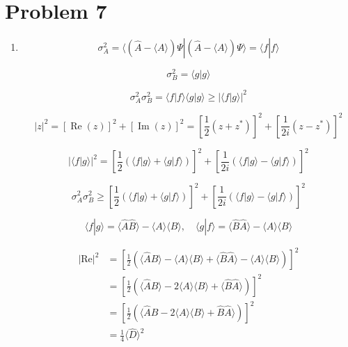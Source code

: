 \documentclass[12pt]{article}
\begin{document}
\section{Problem 7}
\begin{enumerate}
    \item

          \[
              \sigma_A^2 = \langle ( \hat{A} - \langle A \rangle ) \Psi | ( \hat{A} - \langle A \rangle ) \Psi \rangle = \langle f | f \rangle
          \]

          \[
              \sigma_B^2 = \langle g | g \rangle
          \]

          \[
              \sigma_A^2 \sigma_B^2 = \langle f | f \rangle \langle g | g \rangle \geq | \langle f | g \rangle |^2
          \]

          \[
              |z|^2 = [\operatorname{Re}(z)]^2 + [\operatorname{Im}(z)]^2 = \left[ \frac{1}{2} (z + z^*) \right]^2 + \left[ \frac{1}{2i} (z - z^*) \right]^2
          \]

          \[
              |\langle f | g \rangle |^2 = \left[ \frac{1}{2} (\langle f | g \rangle  + \langle g | f \rangle) \right]^2 + \left[ \frac{1}{2i} (\langle f | g \rangle  - \langle g | f \rangle ) \right]^2
          \]

          \[
              \sigma_A^2 \sigma_B^2 \geq \left[ \frac{1}{2} (\langle f | g \rangle + \langle g | f \rangle) \right]^2 + \left[ \frac{1}{2i} (\langle f | g \rangle - \langle g | f \rangle) \right]^2
          \]

          \[
              \langle f | g \rangle = \langle \hat{A} \hat{B} \rangle - \langle A \rangle \langle B \rangle, \quad
              \langle g | f \rangle = \langle \hat{B} \hat{A} \rangle - \langle A \rangle \langle B \rangle
          \]

          \begin{equation*}
              \begin{split}
                  {|\text{Re}|}^2
                   & = \left[ \frac{1}{2} (\langle \hat{A} \hat{B} \rangle - \langle A \rangle \langle B \rangle + \langle \hat{B} \hat{A} \rangle - \langle A \rangle \langle B \rangle) \right]^2 \\
                   & = \left[ \frac{1}{2} (\langle \hat{A} \hat{B} \rangle - 2\langle A \rangle \langle B \rangle + \langle \hat{B} \hat{A} \rangle) \right]^2                                      \\
                   & = \left[ \frac{1}{2} (\langle \hat{A} \hat{B} - 2\langle A \rangle \langle B \rangle + \hat{B} \hat{A} \rangle) \right]^2                                                      \\
                   & = \frac{1}{4} \langle\hat{D}\rangle^2                                                                                                                                          \\
              \end{split}
          \end{equation*}


\end{enumerate}
\end{document}
